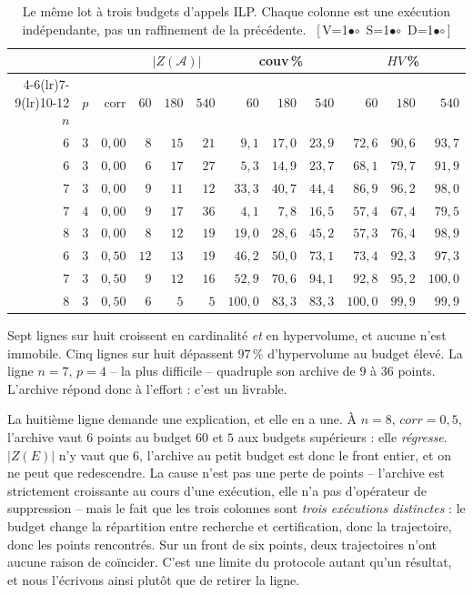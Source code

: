 \documentclass[11pt,a4paper]{article}
\theoremstyle{plain}
\theoremstyle{remark}
\newcommand{\cfgm}[1]{\ifnum#1=1$\bullet$\else$\circ$\fi}
\newcommand{\conf}[3]{%
  \textsf{\footnotesize[\,V\cfgm{#1}\ S\cfgm{#2}\ D\cfgm{#3}\,]}}
\begin{document}
\begin{table}[H]
\centering
\caption{Le même lot à trois budgets d'appels ILP. Chaque colonne est une
exécution indépendante, pas un raffinement de la précédente.\ \conf{1}{1}{1}}
\label{tab:livrableB}
\begin{tabular}{rrrrrrrrrrrr}
\toprule
& & & \multicolumn{3}{c}{$|Z(\mathcal{A})|$} & \multicolumn{3}{c}{couv\,\%}
& \multicolumn{3}{c}{$HV$\,\%}\\
\cmidrule(lr){4-6}\cmidrule(lr){7-9}\cmidrule(lr){10-12}
$n$ & $p$ & corr & $60$ & $180$ & $540$ & $60$ & $180$ & $540$
& $60$ & $180$ & $540$\\
\midrule
$6$ & $3$ & $0{,}00$ & $8$  & $15$ & $21$ & $9{,}1$  & $17{,}0$ & $23{,}9$ & $72{,}6$ & $90{,}6$ & $93{,}7$\\
$6$ & $3$ & $0{,}00$ & $6$  & $17$ & $27$ & $5{,}3$  & $14{,}9$ & $23{,}7$ & $68{,}1$ & $79{,}7$ & $91{,}9$\\
$7$ & $3$ & $0{,}00$ & $9$  & $11$ & $12$ & $33{,}3$ & $40{,}7$ & $44{,}4$ & $86{,}9$ & $96{,}2$ & $98{,}0$\\
$7$ & $4$ & $0{,}00$ & $9$  & $17$ & $36$ & $4{,}1$  & $7{,}8$  & $16{,}5$ & $57{,}4$ & $67{,}4$ & $79{,}5$\\
$8$ & $3$ & $0{,}00$ & $8$  & $12$ & $19$ & $19{,}0$ & $28{,}6$ & $45{,}2$ & $57{,}3$ & $76{,}4$ & $98{,}9$\\
$6$ & $3$ & $0{,}50$ & $12$ & $13$ & $19$ & $46{,}2$ & $50{,}0$ & $73{,}1$ & $73{,}4$ & $92{,}3$ & $97{,}3$\\
$7$ & $3$ & $0{,}50$ & $9$  & $12$ & $16$ & $52{,}9$ & $70{,}6$ & $94{,}1$ & $92{,}8$ & $95{,}2$ & $100{,}0$\\
$8$ & $3$ & $0{,}50$ & $6$  & $5$  & $5$  & $100{,}0$& $83{,}3$ & $83{,}3$ & $100{,}0$& $99{,}9$ & $99{,}9$\\
\bottomrule
\end{tabular}
\end{table}

Sept lignes sur huit croissent en cardinalité \emph{et} en hypervolume, et
aucune n'est immobile. Cinq lignes sur huit dépassent $97\,\%$
d'hypervolume au budget élevé. La ligne $n=7$, $p=4$ -- la plus difficile -- quadruple son
archive de $9$ à $36$ points. L'archive répond donc à l'effort : c'est un
livrable.

La huitième ligne demande une explication, et elle en a une. À $n=8$,
$corr=0{,}5$, l'archive vaut $6$ points au budget $60$ et $5$ aux budgets
supérieurs : elle \emph{régresse}. $|Z(E)|$ n'y vaut que $6$, l'archive au
petit budget est donc le front entier, et on ne peut que redescendre. La
cause n'est pas une perte de points -- l'archive est strictement croissante
au cours d'une exécution, elle n'a pas d'opérateur de suppression -- mais le
fait que les trois colonnes sont \emph{trois exécutions distinctes} : le
budget change la répartition entre recherche et certification, donc la
trajectoire, donc les points rencontrés. Sur un front de six points, deux
trajectoires n'ont aucune raison de coïncider. C'est une limite du
protocole autant qu'un résultat, et nous l'écrivons ainsi plutôt que de
retirer la ligne.
\end{document}
